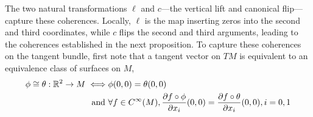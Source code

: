 The two natural transformations $\ell$ and $c$---the vertical lift and canonical flip---capture these coherences.
Locally, $\ell$ is the map inserting zeros into the second and third coordinates, while $c$ flips the second and third arguments, leading to the coherences established in the next proposition.
To capture these coherences on the tangent bundle, first note that a tangent vector on $TM$ is equivalent to an equivalence class of surfaces on $M$,
\begin{align*}
    \phi \cong \theta :\mathbb{R}^2 \to M
    \iff   &  \phi(0,0) = \theta(0,0) \\
    \text{and } &  \forall f \in C^\infty(M), \frac{\partial f \circ \phi}{\partial x_i}(0,0) = \frac{\partial f \circ \theta}{\partial x_i}(0,0), i = 0,1
\end{align*}

